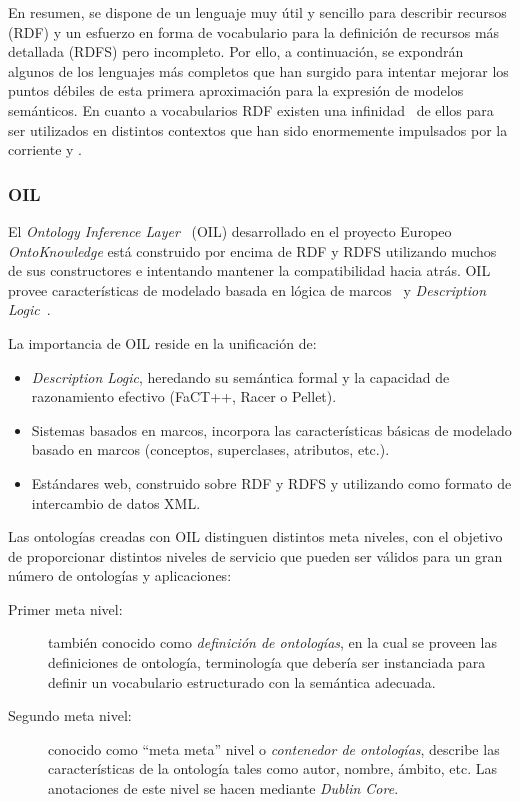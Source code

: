 En resumen, se dispone de un lenguaje muy útil y sencillo para describir recursos (RDF) y 
un esfuerzo en forma de vocabulario para la definición de recursos más detallada (RDFS) pero incompleto. 
Por ello, a continuación, se expondrán algunos de los lenguajes más completos que han surgido para 
intentar mejorar los puntos débiles de esta primera aproximación para la expresión de modelos semánticos. En cuanto
a vocabularios RDF existen una infinidad~\cite{common-vocabularies} de ellos para ser utilizados en distintos contextos que han sido
enormemente impulsados por la corriente \linkeddata y \opendata.
\clearpage

\subsubsection{OIL}
El \textit{Ontology Inference Layer}~\cite{Fensel01oil:an} (\gls{OIL}) desarrollado en el proyecto Europeo 
\textit{OntoKnowledge} está construido por encima de \gls{RDF} y RDFS utilizando muchos de sus constructores e intentando
mantener la compatibilidad hacia atrás. OIL provee características de modelado
basada en lógica de marcos~\cite{Kifer:1989:FHL:66926.66939} y \textit{Description Logic}~\cite{baader03description}.

La importancia de OIL reside en la unificación de:
\begin{itemize}
\item \textit{Description Logic}, heredando su semántica formal y la capacidad
de razonamiento efectivo (FaCT++, Racer o Pellet).
\item Sistemas basados en marcos, incorpora las características básicas de
modelado basado en marcos (conceptos, superclases, atributos, etc.).
\item Estándares web, construido sobre RDF y RDFS y utilizando como formato de
intercambio de datos XML.
\end{itemize}

Las ontologías creadas con OIL distinguen distintos meta niveles, con el
objetivo de proporcionar distintos niveles de servicio que pueden ser válidos para un
gran número de ontologías y aplicaciones:
\begin{description}
\item[Primer meta nivel:] también conocido como \textit{definición de ontologías}, en la
cual se proveen las definiciones de ontología, terminología que debería ser
instanciada para definir un vocabulario estructurado con la semántica adecuada.
\item[Segundo meta nivel:] conocido como ``meta meta'' nivel o \textit{contenedor de
ontologías}, describe las características de la ontología tales como autor,
nombre, ámbito, etc. Las anotaciones de este nivel se hacen mediante
\textit{Dublin Core}.
\end{description}

